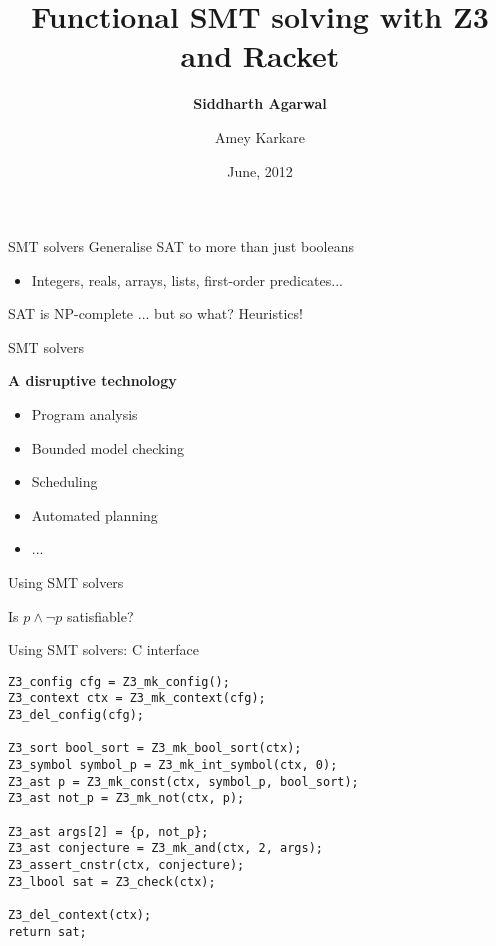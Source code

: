 \documentclass{beamer}
\title[Functional SMT solving]{Functional SMT solving with Z3 and Racket}
\author{\textbf{Siddharth Agarwal} \and Amey Karkare}
\institute{IIT Kanpur}
\date{June, 2012}
\begin{document}
\begin{frame}[plain]
  \titlepage
\end{frame}

\begin{frame}{SMT solvers}
Generalise SAT to more than just booleans

\begin{itemize}
\item Integers, reals, arrays, lists, first-order predicates...
\end{itemize}

SAT is NP-complete \pause ... but so what? Heuristics!
\end{frame}

\begin{frame}{SMT solvers}
\begin{center}
\textbf{A disruptive technology}
\end{center}
\pause
\begin{itemize}
\item Program analysis
\item Bounded model checking
\item Scheduling
\item Automated planning
\item ...
\end{itemize}
\end{frame}

\begin{frame}{Using SMT solvers}

\begin{center}
Is $p \wedge \neg p$ satisfiable?
\end{center}

\end{frame}

\begin{frame}[fragile]{Using SMT solvers: C interface}
\begin{verbatim}
Z3_config cfg = Z3_mk_config();
Z3_context ctx = Z3_mk_context(cfg);
Z3_del_config(cfg);

Z3_sort bool_sort = Z3_mk_bool_sort(ctx);
Z3_symbol symbol_p = Z3_mk_int_symbol(ctx, 0);
Z3_ast p = Z3_mk_const(ctx, symbol_p, bool_sort);
Z3_ast not_p = Z3_mk_not(ctx, p);

Z3_ast args[2] = {p, not_p};
Z3_ast conjecture = Z3_mk_and(ctx, 2, args);
Z3_assert_cnstr(ctx, conjecture);
Z3_lbool sat = Z3_check(ctx);

Z3_del_context(ctx);
return sat;
\end{verbatim}

\end{frame}
\end{document}
